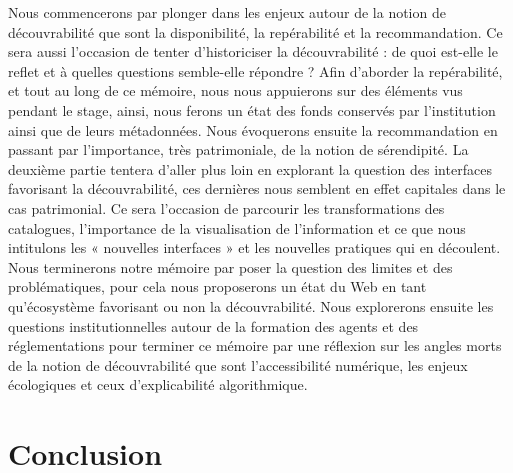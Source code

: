 \documentclass[a4paper,12pt,twoside]{book}
\begin{document}
	Nous commencerons par plonger dans les enjeux autour de la notion de découvrabilité que sont la disponibilité, la repérabilité et la recommandation. Ce sera aussi l’occasion de tenter d’historiciser la découvrabilité : de quoi est-elle le reflet et à quelles questions semble-elle répondre ? Afin d’aborder la repérabilité, et tout au long de ce mémoire, nous nous appuierons sur des éléments vus pendant le stage, ainsi, nous ferons un état des fonds conservés par l’institution ainsi que de leurs métadonnées. Nous évoquerons ensuite la recommandation en passant par l’importance, très patrimoniale, de la notion de sérendipité. La deuxième partie tentera d’aller plus loin en explorant la question des interfaces favorisant la découvrabilité, ces dernières nous semblent en effet capitales dans le cas patrimonial. Ce sera l’occasion de parcourir les transformations des catalogues, l’importance de la visualisation de l’information et ce que nous intitulons les « nouvelles interfaces » et les nouvelles pratiques qui en découlent. Nous terminerons notre mémoire par poser la question des limites et des problématiques, pour cela nous proposerons un état du Web en tant qu’écosystème favorisant ou non la découvrabilité. Nous explorerons ensuite les questions institutionnelles autour de la formation des agents et des réglementations pour terminer ce mémoire par une réflexion sur les angles morts de la notion de découvrabilité que sont l’accessibilité numérique, les enjeux écologiques et ceux d’explicabilité algorithmique.
	\newpage{\pagestyle{empty}\cleardoublepage}
	
	\mainmatter
	
	
	

	
	


	

	
	
	
	
	\chapter*{Conclusion}
	
\end{document}
